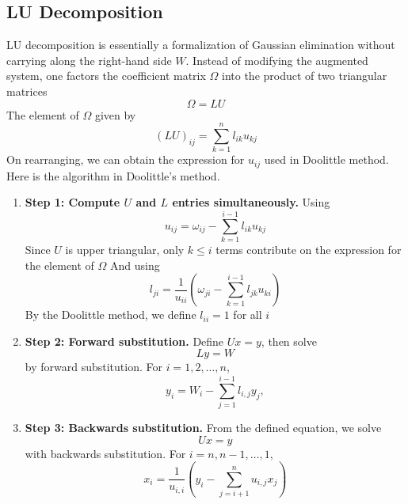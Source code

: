 \documentclass[../../../main.tex]{subfiles}
\begin{document}
\subsection{LU Decomposition}
LU decomposition is essentially a formalization of Gaussian elimination without carrying along the right-hand side $W$.
Instead of modifying the augmented system, one factors the coefficient matrix $\Omega$ into the product of two triangular matrices
\begin{equation*}
    \Omega=LU
\end{equation*}
The element of $\Omega$ given by
\begin{equation*}
    (LU)_{ij}=\sum_{k=1 }^{n}l_{ik}u_{kj}
\end{equation*}
On rearranging, we can obtain the expression for $u_{ij}$ used in Doolittle method.
Here is the algorithm in Doolittle’s method.
\begin{enumerate}
    \item \textbf{Step 1: Compute $U$ and $L$ entries simultaneously.}
          Using
          \begin{equation*}
              u_{ij} = \omega_{ij} - \sum_{k=1}^{i-1} l_{ik} u_{kj}
          \end{equation*}
          Since $U$ is upper triangular, only $k \leq i$ terms contribute on the expression for the element of $\Omega$
          And using
          \begin{equation*}
              l_{ji} = \frac{1}{u_{ii}} \left( \omega_{ji} - \sum_{k=1}^{i-1} l_{jk} u_{ki} \right)
          \end{equation*}
          By the Doolittle method, we define $l_{ii}=1$ for all $i$
    \item \textbf{Step 2: Forward substitution.} Define $Ux=y$, then solve
          \begin{equation*}
              Ly=W
          \end{equation*}
          by forward substitution.
          For $i = 1,2,\ldots,n$,
          \begin{equation*}
              y_i = W_i - \sum_{j=1}^{i-1} l_{i,j} y_j,
          \end{equation*}
    \item \textbf{Step 3: Backwards substitution.} From the defined equation, we solve
          \begin{equation*}
              Ux=y
          \end{equation*}
          with backwards substitution.
          For $i = n, n-1, \ldots, 1$,
          \begin{equation*}
              x_i = \frac{1}{u_{i,i}} \left( y_i - \sum_{j=i+1}^{n} u_{i,j} x_j \right)
          \end{equation*}
\end{enumerate}
\end{document}
